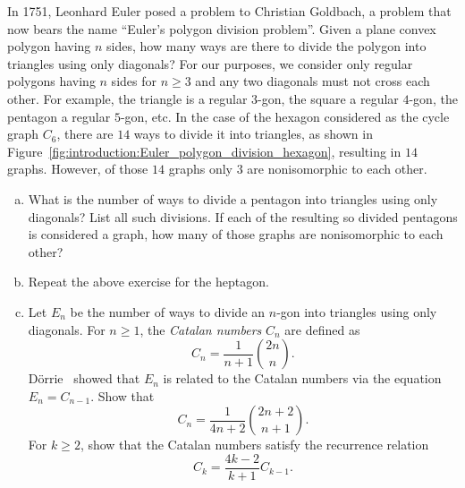 \begin{problem}
\item\label{prob:introduction:Euler_polygon_division}
  In 1751, Leonhard Euler posed a problem
  to Christian Goldbach, a problem that now
  bears the name ``Euler's polygon division
  problem''. Given a
  plane convex polygon having $n$ sides, how many ways are there to
  divide the polygon into triangles using only diagonals? For our
  purposes, we consider only regular polygons having $n$ sides for
  $n \geq 3$ and any two diagonals must not cross each other. For
  example, the triangle is a regular $3$-gon, the square a regular
  $4$-gon, the pentagon a regular $5$-gon, etc. In the case of the
  hexagon considered as the cycle graph $C_6$, there are $14$ ways to
  divide it into triangles, as shown in
  Figure~\ref{fig:introduction:Euler_polygon_division_hexagon},
  resulting in $14$ graphs. However, of those $14$ graphs only $3$ are
  nonisomorphic to each other.
  \begin{enumerate}[(a)]
  \item What is the number of ways to
    divide a pentagon
    into triangles using only diagonals? List all such divisions. If
    each of the resulting so divided pentagons is considered a graph,
    how many of those graphs are
    nonisomorphic to each other?

  \item Repeat the above exercise for the
    heptagon.

  \item Let $E_n$ be the number of ways to
    divide an $n$-gon
    into triangles using only diagonals. For $n \geq 1$, the
    \emph{Catalan numbers} $C_n$ are defined as
    \[
    C_n
    =
    \frac{1}{n+1} \binom{2n}{n}.
    \]
    D\"orrie~\cite[pp.21--27]{Dorrie1965}
    showed that $E_n$ is related to the Catalan
    numbers via the equation $E_n = C_{n-1}$. Show that
    \[
    C_n
    =
    \frac{1}{4n + 2} \binom{2n + 2}{n + 1}.
    \]
    For $k \geq 2$, show that the Catalan
    numbers satisfy the recurrence relation
    \[
    C_k
    =
    \frac{4k - 2}{k + 1} C_{k-1}.
    \]
  \end{enumerate}


\end{problem}
